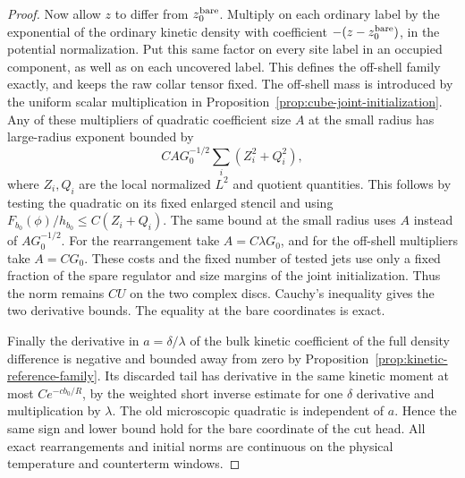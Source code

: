 \documentclass[11pt]{article}
\theoremstyle{definition}
\begin{document}
\begin{proof}
Now allow \(z\) to differ from \(z_0^{\rm bare}\). Multiply
on each ordinary label by the exponential of the
ordinary kinetic density with coefficient
\(-(z-z_0^{\rm bare})\), in the potential normalization.
Put this same factor on every site label in an occupied
component, as well as on each uncovered label. This
defines the off-shell family exactly, and keeps the
raw collar tensor fixed. The off-shell mass is introduced
by the uniform scalar multiplication in
Proposition~\ref{prop:cube-joint-initialization}.
Any of these multipliers of quadratic coefficient
size \(A\) at the small radius has large-radius
exponent bounded by
\begin{equation}
 C A G_0^{-1/2}\sum_{i}
       \left(Z_i^2+Q_i^2\right),
\end{equation}
where \(Z_i,Q_i\) are the local normalized \(L^2\)
and quotient quantities. This follows by testing the
quadratic on its fixed enlarged stencil and using
\(F_{b_0}(\phi)/h_{b_0}\le C(Z_i+Q_i)\).
The same bound at the small radius uses \(A\) instead
of \(A G_0^{-1/2}\). For the rearrangement take
\(A=C\lambda G_0\), and for the off-shell multipliers
take \(A=C G_0\). These costs and the fixed number of
tested jets use only a fixed fraction of the spare
regulator and size margins of the joint initialization.
Thus the norm remains \(CU\) on the two complex discs.
Cauchy's inequality gives the two derivative bounds.
The equality at the bare coordinates is exact.

Finally the derivative in \(a=\delta/\lambda\) of the
bulk kinetic coefficient of the full density difference
is negative and bounded away from zero by
Proposition~\ref{prop:kinetic-reference-family}.
Its discarded tail has derivative in the same kinetic
moment at most \(C e^{-c b_0/R}\), by the weighted
short inverse estimate for one \(\delta\) derivative
and multiplication by \(\lambda\). The old microscopic
quadratic is independent of \(a\). Hence the same sign
and lower bound hold for the bare coordinate of the
cut head. All exact rearrangements and initial
norms are continuous on the physical temperature
and counterterm windows.
\end{proof}
\end{document}
